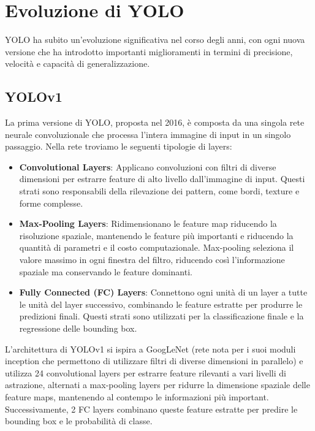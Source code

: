\section{Evoluzione di YOLO}
YOLO ha subito un'evoluzione significativa nel corso degli anni, con ogni nuova versione che ha introdotto importanti miglioramenti in termini di precisione, velocità e capacità di generalizzazione.

\subsection{YOLOv1}
La prima versione di YOLO, proposta nel 2016\cite{14}, è composta da una singola rete neurale convoluzionale che processa l'intera immagine di input in un singolo passaggio. Nella rete troviamo le seguenti tipologie di layers:
\begin{itemize}
  \item \textbf{Convolutional Layers}: Applicano convoluzioni con filtri di diverse dimensioni per estrarre feature di alto livello dall'immagine di input. Questi strati sono responsabili della rilevazione dei pattern, come bordi, texture e forme complesse.
  \item \textbf{Max-Pooling Layers}: Ridimensionano le feature map riducendo la risoluzione spaziale, mantenendo le feature più importanti e riducendo la quantità di parametri e il costo computazionale. Max-pooling seleziona il valore massimo in ogni finestra del filtro, riducendo così l'informazione spaziale ma conservando le feature dominanti.
  \item \textbf{Fully Connected (FC) Layers}:  Connettono ogni unità di un layer a tutte le unità del layer successivo, combinando le feature estratte per produrre le predizioni finali. Questi strati sono utilizzati per la classificazione finale e la regressione delle bounding box.
\end{itemize}

L'architettura di YOLOv1 si ispira a GoogLeNet (rete nota per i suoi moduli inception che permettono di utilizzare filtri di diverse dimensioni in parallelo) e utilizza 24 convolutional layers per estrarre feature rilevanti a vari livelli di astrazione, alternati a max-pooling layers per ridurre la dimensione spaziale delle feature maps, mantenendo al contempo le informazioni più important. Successivamente, 2 FC layers combinano queste feature estratte per predire le bounding box e le probabilità di classe.


